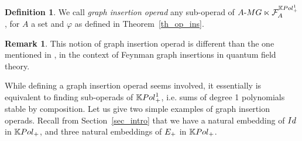 \documentclass[11pt]{article}
\theoremstyle{definition}
\newtheorem{defi}[theo]{Definition}
\newtheorem{rema}[theo]{Remark}
\numberwithin{equation}{section}
\newcommand{\spe}[1]{\normalfont{\textsc{#1}}}
\newcommand{\K}{\mathbb{K}}
\newcommand{\id}{Id}
\newcommand{\MG}{\spe{MG}}
\newcommand{\Poly}{\spe{Pol}_+}
\newcommand{\augm}[2]{#1\text{-}#2}
\newcommand{\func}[2]{\mathcal{F}_{#1}^{#2}}
\newcommand{\Sym}{\spe{E}}
\begin{document}
\begin{defi}
    We call {\em graph insertion operad} any sub-operad of $\augm{A}{\MG}\ltimes\func{A}{\K\Poly^1}$,
    for $A$ a set and $\varphi$ as defined in Theorem~\ref{th_op_ins}.
\end{defi}

\begin{rema}
    This notion of graph insertion operad is different than the one mentioned in \cite{Kreimer:2000ja}, in 
    the context of Feynman graph insertions in quantum field theory.
\end{rema}


While defining a graph insertion operad seems involved, it essentially is equivalent to finding sub-operads of $\K\Poly^1$,
i.e. sums of degree 1 polynomials stable by composition.
Let us give two simple examples of graph insertion operads. Recall from 
Section~\ref{sec_intro} that we have a natural embedding of $\spe{\id}$ in $\K\Poly$, and three natural 
embeddings of $\Sym_+$ in $\K\Poly$.
\end{document}
